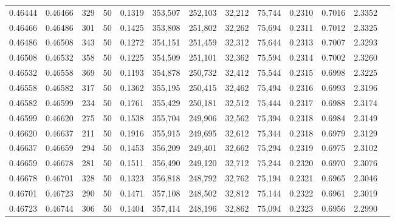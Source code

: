 \begin{tabular}{rrrrrrrrrrrrr}
0.46444 & 0.46466 &   329 &  50 &                                     0.1319 & 353,507 & 252,103 &  32,212 &  75,744 & 0.2310 & 0.7016 & 2.3352 \\
0.46466 & 0.46486 &   301 &  50 &                                     0.1425 & 353,808 & 251,802 &  32,262 &  75,694 & 0.2311 & 0.7012 & 2.3325 \\
0.46486 & 0.46508 &   343 &  50 &                                     0.1272 & 354,151 & 251,459 &  32,312 &  75,644 & 0.2313 & 0.7007 & 2.3293 \\
0.46508 & 0.46532 &   358 &  50 &                                     0.1225 & 354,509 & 251,101 &  32,362 &  75,594 & 0.2314 & 0.7002 & 2.3260 \\
0.46532 & 0.46558 &   369 &  50 &                                     0.1193 & 354,878 & 250,732 &  32,412 &  75,544 & 0.2315 & 0.6998 & 2.3225 \\
0.46558 & 0.46582 &   317 &  50 &                                     0.1362 & 355,195 & 250,415 &  32,462 &  75,494 & 0.2316 & 0.6993 & 2.3196 \\
0.46582 & 0.46599 &   234 &  50 &                                     0.1761 & 355,429 & 250,181 &  32,512 &  75,444 & 0.2317 & 0.6988 & 2.3174 \\
0.46599 & 0.46620 &   275 &  50 &                                     0.1538 & 355,704 & 249,906 &  32,562 &  75,394 & 0.2318 & 0.6984 & 2.3149 \\
0.46620 & 0.46637 &   211 &  50 &                                     0.1916 & 355,915 & 249,695 &  32,612 &  75,344 & 0.2318 & 0.6979 & 2.3129 \\
0.46637 & 0.46659 &   294 &  50 &                                     0.1453 & 356,209 & 249,401 &  32,662 &  75,294 & 0.2319 & 0.6975 & 2.3102 \\
0.46659 & 0.46678 &   281 &  50 &                                     0.1511 & 356,490 & 249,120 &  32,712 &  75,244 & 0.2320 & 0.6970 & 2.3076 \\
0.46678 & 0.46701 &   328 &  50 &                                     0.1323 & 356,818 & 248,792 &  32,762 &  75,194 & 0.2321 & 0.6965 & 2.3046 \\
0.46701 & 0.46723 &   290 &  50 &                                     0.1471 & 357,108 & 248,502 &  32,812 &  75,144 & 0.2322 & 0.6961 & 2.3019 \\
0.46723 & 0.46744 &   306 &  50 &                                     0.1404 & 357,414 & 248,196 &  32,862 &  75,094 & 0.2323 & 0.6956 & 2.2990 \\

\end{tabular}

